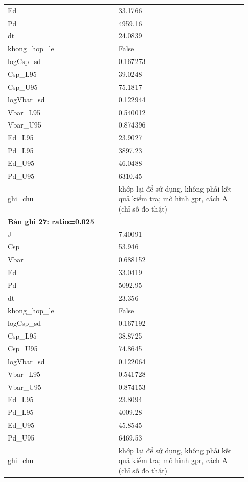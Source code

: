 \begin{longtable}{p{0.43\linewidth}p{0.50\linewidth}}
Ed & 33.1766 \\
Pd & 4959.16 \\
dt & 24.0839 \\
khong\_\allowbreak hop\_\allowbreak le & False \\
logCsp\_\allowbreak sd & 0.167273 \\
Csp\_\allowbreak L95 & 39.0248 \\
Csp\_\allowbreak U95 & 75.1817 \\
logVbar\_\allowbreak sd & 0.122944 \\
Vbar\_\allowbreak L95 & 0.540012 \\
Vbar\_\allowbreak U95 & 0.874396 \\
Ed\_\allowbreak L95 & 23.9027 \\
Pd\_\allowbreak L95 & 3897.23 \\
Ed\_\allowbreak U95 & 46.0488 \\
Pd\_\allowbreak U95 & 6310.45 \\
ghi\_\allowbreak chu & khớp lại để sử dụng, không phải kết quả kiểm tra; mô hình gpr, cách A (chỉ số đo thật) \\
\midrule
\multicolumn{2}{p{0.95\linewidth}}{\textbf{Bản ghi 27: ratio=0.025}} \\
J & 7.40091 \\
Csp & 53.946 \\
Vbar & 0.688152 \\
Ed & 33.0419 \\
Pd & 5092.95 \\
dt & 23.356 \\
khong\_\allowbreak hop\_\allowbreak le & False \\
logCsp\_\allowbreak sd & 0.167192 \\
Csp\_\allowbreak L95 & 38.8725 \\
Csp\_\allowbreak U95 & 74.8645 \\
logVbar\_\allowbreak sd & 0.122064 \\
Vbar\_\allowbreak L95 & 0.541728 \\
Vbar\_\allowbreak U95 & 0.874153 \\
Ed\_\allowbreak L95 & 23.8094 \\
Pd\_\allowbreak L95 & 4009.28 \\
Ed\_\allowbreak U95 & 45.8545 \\
Pd\_\allowbreak U95 & 6469.53 \\
ghi\_\allowbreak chu & khớp lại để sử dụng, không phải kết quả kiểm tra; mô hình gpr, cách A (chỉ số đo thật) \\

\end{longtable}
